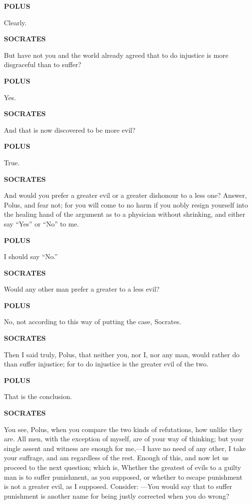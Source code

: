 \documentclass[11pt,letter]{article}
\begin{document}
\par \textbf{POLUS}
\par   Clearly.

\par \textbf{SOCRATES}
\par   But have not you and the world already agreed that to do injustice is more disgraceful than to suffer?

\par \textbf{POLUS}
\par   Yes.

\par \textbf{SOCRATES}
\par   And that is now discovered to be more evil?

\par \textbf{POLUS}
\par   True.

\par \textbf{SOCRATES}
\par   And would you prefer a greater evil or a greater dishonour to a less one? Answer, Polus, and fear not; for you will come to no harm if you nobly resign yourself into the healing hand of the argument as to a physician without shrinking, and either say “Yes” or “No” to me.

\par \textbf{POLUS}
\par   I should say “No.”

\par \textbf{SOCRATES}
\par   Would any other man prefer a greater to a less evil?

\par \textbf{POLUS}
\par   No, not according to this way of putting the case, Socrates.

\par \textbf{SOCRATES}
\par   Then I said truly, Polus, that neither you, nor I, nor any man, would rather do than suffer injustice; for to do injustice is the greater evil of the two.

\par \textbf{POLUS}
\par   That is the conclusion.

\par \textbf{SOCRATES}
\par   You see, Polus, when you compare the two kinds of refutations, how unlike they are. All men, with the exception of myself, are of your way of thinking; but your single assent and witness are enough for me,—I have no need of any other, I take your suffrage, and am regardless of the rest. Enough of this, and now let us proceed to the next question; which is, Whether the greatest of evils to a guilty man is to suffer punishment, as you supposed, or whether to escape punishment is not a greater evil, as I supposed. Consider: —You would say that to suffer punishment is another name for being justly corrected when you do wrong?
\end{document}
